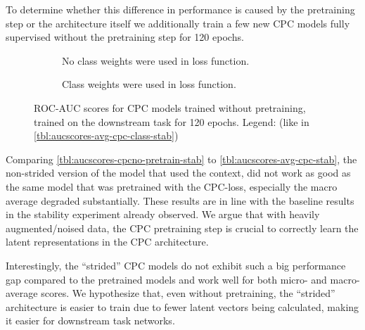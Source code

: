 To determine whether this difference in performance is caused by the pretraining step or the architecture itself we additionally train a few new CPC models fully supervised without the pretraining step for 120 epochs. 
\begin{figure}
	\begin{subfigure}[t]{0.49\hsize}\centering
		
		\caption{No class weights were used in loss function.}
		\label{tbl:aucscores-cpcno-pretrain-noclass-stab}
	\end{subfigure}
	\begin{subfigure}[t]{0.49\hsize}\centering
		
		\caption{Class weights were used in loss function.}
		\label{tbl:aucscores-cpcno-pretrain-class-stab}
	\end{subfigure}
	\caption*{\small ROC-AUC scores for CPC models trained without pretraining, trained on the downstream task for 120 epochs. Legend: (like in \autoref{tbl:aucscores-avg-cpc-class-stab})}
	\label{tbl:aucscores-cpcno-pretrain-stab}
\end{figure}
Comparing \autoref{tbl:aucscores-cpcno-pretrain-stab} to \autoref{tbl:aucscores-avg-cpc-stab}, the non-strided version of the model that used the context, did not work as good as the same model that was pretrained with the CPC-loss, especially the macro average degraded substantially. These results are in line with the baseline results in the stability experiment already observed. We argue that with heavily augmented/noised data, the CPC pretraining step is crucial to correctly learn the latent representations in the CPC architecture.

Interestingly, the \enquote{strided} CPC models do not exhibit such a big performance gap compared to the pretrained models and work well for both micro- and macro-average scores. We hypothesize that, even without pretraining, the \enquote{strided} architecture is easier to train due to fewer latent vectors being calculated, making it easier for downstream task networks.

